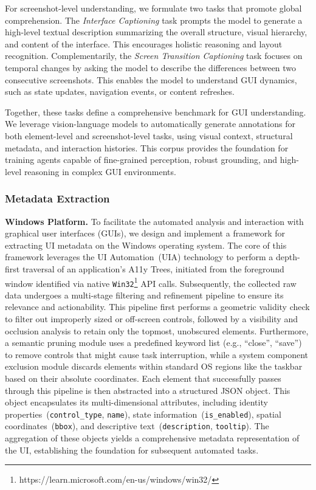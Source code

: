 For screenshot-level understanding, we formulate two tasks that promote global comprehension. The \textit{Interface Captioning} task prompts the model to generate a high-level textual description summarizing the overall structure, visual hierarchy, and content of the interface. This encourages holistic reasoning and layout recognition. Complementarily, the \textit{Screen Transition Captioning} task focuses on temporal changes by asking the model to describe the differences between two consecutive screenshots. This enables the model to understand GUI dynamics, such as state updates, navigation events, or content refreshes.

Together, these tasks define a comprehensive benchmark for GUI understanding. We leverage vision-language models to automatically generate annotations for both element-level and screenshot-level tasks, using visual context, structural metadata, and interaction histories. This corpus provides the foundation for training agents capable of fine-grained perception, robust grounding, and high-level reasoning in complex GUI environments.


\subsubsection{Metadata Extraction}
\textbf{Windows Platform.} To facilitate the automated analysis and interaction with graphical user interfaces (GUIs), we design and implement a framework for extracting UI metadata on the Windows operating system. The core of this framework leverages the UI Automation~(UIA) technology to perform a depth-first traversal of an application's A11y Trees, initiated from the foreground window identified via native \texttt{Win32}\footnote{https://learn.microsoft.com/en-us/windows/win32/} API calls. Subsequently, the collected raw data undergoes a multi-stage filtering and refinement pipeline to ensure its relevance and actionability. This pipeline first performs a geometric validity check to filter out improperly sized or off-screen controls, followed by a visibility and occlusion analysis to retain only the topmost, unobscured elements. Furthermore, a semantic pruning module uses a predefined keyword list (e.g., ``close'', ``save'') to remove controls that might cause task interruption, while a system component exclusion module discards elements within standard OS regions like the taskbar based on their absolute coordinates. Each element that successfully passes through this pipeline is then abstracted into a structured JSON object. This object encapsulates its multi-dimensional attributes, including identity properties~(\texttt{control\_type}, \texttt{name}), state information~(\texttt{is\_enabled}), spatial coordinates~(\texttt{bbox}), and descriptive text~(\texttt{description}, \texttt{tooltip}). The aggregation of these objects yields a comprehensive metadata representation of the UI, establishing the foundation for subsequent automated tasks.

